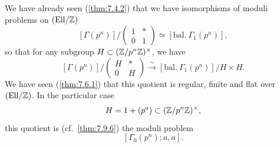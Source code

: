 \kmitem\label{item:10.12.1}
We have already seen (\ref{thm:7.4.2}) that we have isomorphisms of moduli problems on $(\mathrm{Ell}/\mathbb{Z})$
\[
[\Gamma(p^n)]/\begin{pmatrix} 1 & * \\ 0 & 1 \end{pmatrix} \simeq [\mathrm{bal.}\ \Gamma_1(p^n)] ,
\]
so that for any subgroup $H \subset (\mathbb{Z}/p^n\mathbb{Z})^\times$, we have
\[
[\Gamma(p^n)]/\begin{pmatrix} H & * \\ 0 & H \end{pmatrix} \xrightarrow{\sim} [\mathrm{bal.}\ \Gamma_1(p^n)]/H \times H .
\]
We have seen (\ref{thm:7.6.1}) that this quotient is regular, finite and flat over $(\mathrm{Ell}/\mathbb{Z})$. In the particular case
\[
H = 1 + (p^a) \subset (\mathbb{Z}/p^n\mathbb{Z})^\times ,
\]
this quotient is (cf.~\ref{thm:7.9.6}) the moduli problem
\[
[\Gamma_0(p^n); a, a] .
\]


